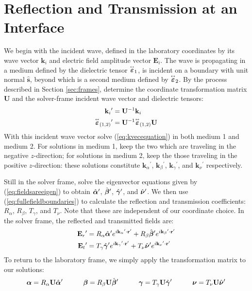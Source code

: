 \documentclass[11pt, reqno]{book}%
\newcounter{ct}
\newcommand{\es}{\begin{equation}}
\newcommand{\ef}{\end{equation} \vspace{0.05in}}
\newcommand{\mbf}{\mathbf}
\newcommand{\mbfg}[1]{\mbf{\mbox{\boldmath$#1$}}}
\newcommand{\mbfgh}[1]{\hat{\mbfg{#1}}}
\newcommand{\mbfh}[1]{\hat{\mbf{#1}}}
\newcommand{\p}{{^\prime}}
\newcommand{\ve}{\varepsilon}
\newcommand{\tens}{\overset{\text{\tiny$\leftrightarrow$}}}
\begin{document}

\section{Reflection and Transmission at an Interface}
\label{sec:reflectiontransmission}




We begin with the incident wave, defined in the laboratory coordinates by its wave vector $\mbf{k}_i$ and electric field amplitude vector $\mbf{E}_i$. The wave is propagating in a medium defined by the dielectric tensor $\tens{\mbfg{\ve}}_1$, is incident on a boundary with unit normal $\mbfh{s}$, beyond which is a second medium defined by $\tens{\mbfg{\ve}}_2$. By the process described in Section \ref{sec:frames}, determine the coordinate transformation matrix $\mbf{U}$ and the solver-frame incident wave vector and dielectric tensors:
\begin{subequations}
\begin{align}
\mbf{k}_i\p &=\mbf{U}^{-1} \mbf{k}_i \\
\tens{\mbfg{\ve}}_{(1,2)}\p &= \mbf{U}^{-1} \tens{\mbfg{\ve}}_{(1,2)} \mbf{U}
\end{align}
\end{subequations}
\noindent With this incident wave vector solve (\ref{eq:kvecequation}) in both medium 1 and medium 2. For solutions in medium 1, keep the two which are traveling in the negative $z$-direction; for solutions in medium 2, keep the those traveling in the positive $z$-direction: these solutions constitute $\mbf{k}_\alpha\p$, $\mbf{k}_\beta\p$, $\mbf{k}_\gamma\p$, and $\mbf{k}_\nu\p$ respectively.

Still in the solver frame, solve the eigenvector equations given by (\ref{eq:fieldsareeigen}) to obtain $\mbfgh{\alpha}\p$, $\mbfgh{\beta}\p$, $\mbfgh{\gamma}\p$, and $\mbfgh{\nu}\p$. We then use (\ref{eq:fullefieldboundaries}) to calculate the reflection and transmission coefficients: $R_\alpha$, $R_\beta$, $T_\gamma$, and $T_\nu$. Note that these are independent of our coordinate choice. In the solver frame, the reflected and transmitted fields are:
\begin{subequations}
\begin{align}
\mbf{E}_r\p &= R_\alpha \mbfgh{\alpha}\p e^{i \mbf{k}_\alpha\p \cdot \mbf{r}\p} + R_\beta \mbfgh{\beta}\p e^{i \mbf{k}_\beta\p \cdot \mbf{r}\p} \\
\mbf{E}_t\p &= T_\gamma \mbfgh{\gamma}\p e^{i \mbf{k}_\gamma\p \cdot \mbf{r}\p} + T_\nu \mbfgh{\nu}\p e^{i \mbf{k}_\nu\p \cdot \mbf{r}\p} 
\end{align}
\end{subequations}
\noindent To return to the laboratory frame, we simply apply the transformation matrix to our solutions:
\es
\mbfg{\alpha} = R_\alpha \mbf{U} \mbfgh{\alpha}\p \quad\quad\quad \mbfg{\beta} = R_\beta \mbf{U} \mbfgh{\beta}\p
\quad\quad\quad \mbfg{\gamma} = T_\gamma \mbf{U} \mbfgh{\gamma}\p \quad\quad \quad \mbfg{\nu} = T_\nu \mbf{U} \mbfgh{\nu}\p
\ef
\end{document}

